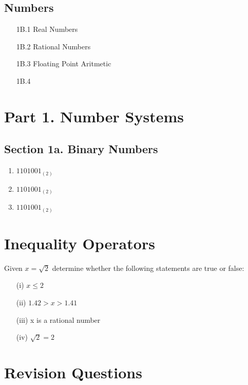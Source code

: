 \documentclass[]{report}
\begin{document}
\subsection*{Numbers}
\begin{itemize}
\item[1B.1] Real Numbers
\item[1B.2] Rational Numbers
\item[1B.3] Floating Point Aritmetic
\item[1B.4] 
\end{itemize}

\section*{Part 1. Number Systems}

\subsection*{Section 1a. Binary Numbers}

\begin{enumerate}
\item $1101001_{(2)}$
\item $1101001_{(2)}$
\item $1101001_{(2)}$
\end{enumerate}
\section{Inequality Operators}


Given $x = \sqrt{2}$ determine whether the following statements are true or false:

\begin{itemize}
\item[(i)] $x \leq 2$
\item[(ii)] $1.42 > x > 1.41$
\item[(iii)] x is a rational number
\item[(iv)] $\sqrt{2} = 2$
\end{itemize}

\section{Revision Questions}
\end{document}

